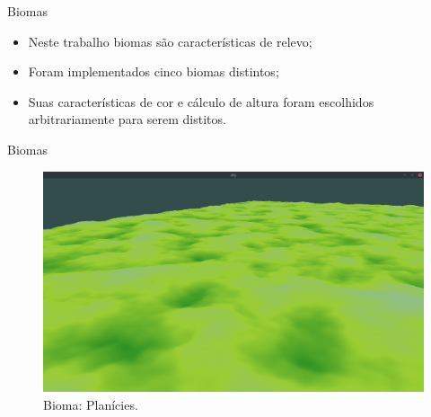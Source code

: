 \begin{frame}{Biomas}
    \begin{itemize} \setlength\itemsep{1em}
        \item Neste trabalho biomas são características de relevo;
        \item Foram implementados cinco biomas distintos;
        \item Suas características de cor e cálculo de altura foram escolhidos arbitrariamente
        para serem distitos.
    \end{itemize}
    
    
    
\end{frame}

\begin{frame}{Biomas}
    \begin{figure}[H]
        \centering
        \includegraphics[width=.9\textwidth]{img/biomas/bssPlains.png}
        \caption{Bioma: Planícies.}
        \label{fig:img_biomas_bssPlains}
    \end{figure}
    
    
\end{frame}

